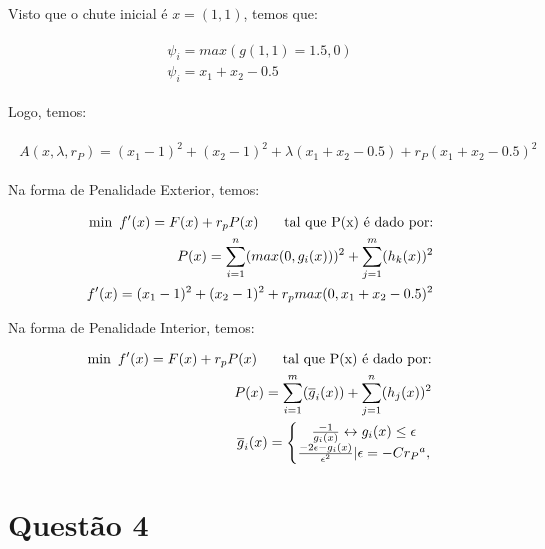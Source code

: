 \documentclass[a4paper, 12pt]{article}
\begin{document}
Visto que o chute inicial é $x = (1,1)$, temos que:

\begin{align*}
\begin{split}
\psi_i = max(g(1,1) = 1.5, 0) \\
\psi_i = x_1 + x_2 - 0.5 
\end{split}
\end{align*}

Logo, temos:

\begin{align*}
\begin{split}
A(x,\lambda, r_P) = (x_1 - 1)^2 + (x_2 - 1)^2 + \lambda (x_1 + x_2 - 0.5) + r_P (x_1 + x_2 - 0.5)^2
\end{split}
\end{align*}

Na forma de Penalidade Exterior, temos:

\begin{align*}
\begin{split}
\text{min\phantom{0}} f'(x) = F(x) + r_p P(x) \text{\phantom{000} tal que P(x) é dado por:} \\
P(x) = \sum_{i=1}^{n} (max(0,g_i(x)))^2 + \sum_{j=1}^{m} (h_k(x))^2 \\
f'(x) = (x_1 - 1)^2 + (x_2 - 1)^2 + r_p max (0,x_1 + x_2 - 0.5)^2
\end{split}
\end{align*}

Na forma de Penalidade Interior, temos:

\begin{align*}
\begin{split}
\text{min\phantom{0}} f'(x) = F(x) + r_p P(x) \text{\phantom{000} tal que P(x) é dado por:} \\
P(x) = \sum_{i=1}^{m} (\overline g_i(x)) +  \sum_{j=1}^{n} (h_j(x))^2 \\
\overline g_i(x) = 
\left\{\begin{matrix}
\frac{-1}{g_i(x)} \leftrightarrow g_i(x) \leq  \epsilon  \\ 
\frac{-2 \epsilon - g_i(x)}{\epsilon^2} | \epsilon = -C {r_P}^a, 
\end{matrix}\right.
\end{split}
\end{align*}

\newpage

\newpage
\section*{Questão 4}
\end{document}
